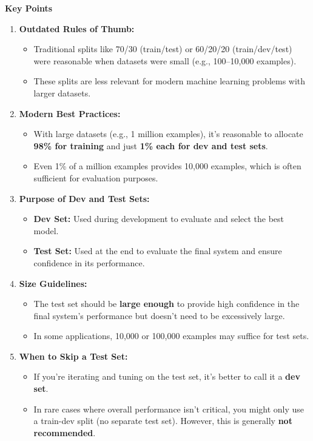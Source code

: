 \documentclass[letterpaper,12pt,notitlepage,twoside]{report}
\begin{document}
\textbf{Key Points}

\begin{enumerate}[label=\textbf{\arabic*.}]
    \item \textbf{Outdated Rules of Thumb:}
    \begin{itemize}
        \item Traditional splits like 70/30 (train/test) or 60/20/20 (train/dev/test) were reasonable when datasets were small (e.g., 100–10,000 examples).
        \item These splits are less relevant for modern machine learning problems with larger datasets.
    \end{itemize}

    \item \textbf{Modern Best Practices:}
    \begin{itemize}
        \item With large datasets (e.g., 1 million examples), it’s reasonable to allocate \textbf{98\% for training} and just \textbf{1\% each for dev and test sets}.
        \item Even 1\% of a million examples provides 10,000 examples, which is often sufficient for evaluation purposes.
    \end{itemize}

    \item \textbf{Purpose of Dev and Test Sets:}
    \begin{itemize}
        \item \textbf{Dev Set:} Used during development to evaluate and select the best model.
        \item \textbf{Test Set:} Used at the end to evaluate the final system and ensure confidence in its performance.
    \end{itemize}

    \item \textbf{Size Guidelines:}
    \begin{itemize}
        \item The test set should be \textbf{large enough} to provide high confidence in the final system's performance but doesn't need to be excessively large.
        \item In some applications, 10,000 or 100,000 examples may suffice for test sets.
    \end{itemize}

    \item \textbf{When to Skip a Test Set:}
    \begin{itemize}
        \item If you’re iterating and tuning on the test set, it’s better to call it a \textbf{dev set}.
        \item In rare cases where overall performance isn't critical, you might only use a train-dev split (no separate test set). However, this is generally \textbf{not recommended}.
    \end{itemize}


\end{enumerate}
\end{document}
